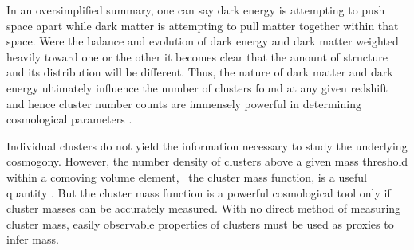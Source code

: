 In an oversimplified summary, one can say dark energy is attempting to
push space apart while dark matter is attempting to pull matter
together within that space. Were the balance and evolution of dark
energy and dark matter weighted heavily toward one or the other it
becomes clear that the amount of structure and its distribution will
be different. Thus, the nature of dark matter and dark energy
ultimately influence the number of clusters found at any given
redshift \citep[\eg][]{1993MNRAS.262.1023W} and hence cluster number
counts are immensely powerful in determining cosmological parameters
\citep[\eg][]{2001ApJ...561...13B}.

Individual clusters do not yield the information necessary to study
the underlying cosmogony. However, the number density of clusters
above a given mass threshold within a comoving volume element, \ie\
the cluster mass function, is a useful quantity
\citep{voitreview}. But the cluster mass function is a powerful
cosmological tool only if cluster masses can be accurately
measured. With no direct method of measuring cluster mass, easily
observable properties of clusters must be used as proxies to infer
mass.

